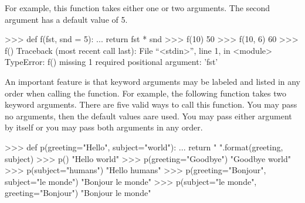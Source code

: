 \documentclass[11pt]{cselabheader}
\begin{document}
For example, this function takes either one or two arguments. The second
argument has a default value of 5.

\begin{pyconcode}
>>> def f(fst, snd = 5):
...    return fst * snd
>>> f(10)
50
>>> f(10, 6)
60
>>> f()
Traceback (most recent call last):
  File ``<stdin>'', line 1, in <module>
TypeError: f() missing 1 required positional argument: 'fst'
\end{pyconcode}

An important feature is that keyword arguments may be labeled
and listed in any order when calling the function. For example,
the following function takes two keyword arguments. There are five
valid ways to call this function. You may pass no arguments, then
the default values aare used. You may pass either argument by itself
or you may pass both arguments in any order.

\begin{pyconcode}
>>> def p(greeting="Hello", subject="world"):
...     return "{} {}".format(greeting, subject)
>>> p()
"Hello world"
>>> p(greeting="Goodbye")
"Goodbye world"
>>> p(subject="humans")
"Hello humans"
>>> p(greeting="Bonjour", subject="le monde")
"Bonjour le monde"
>>> p(subject="le monde", greeting="Bonjour")
"Bonjour le monde"
\end{pyconcode}
\end{document}
